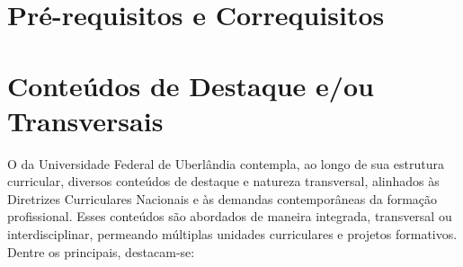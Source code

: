 \section{Pré-requisitos e Correquisitos}


\section{Conteúdos de Destaque e/ou Transversais}

O \ppccurso da Universidade Federal de Uberlândia contempla, ao longo de sua estrutura curricular, diversos conteúdos de destaque e natureza transversal, alinhados às Diretrizes Curriculares Nacionais e às demandas contemporâneas da formação profissional. Esses conteúdos são abordados de maneira integrada, transversal ou interdisciplinar, permeando múltiplas unidades curriculares e projetos formativos. Dentre os principais, destacam-se:

